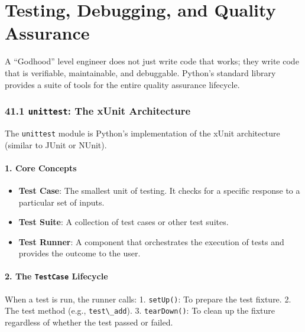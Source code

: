 \hypertarget{testing-debugging-and-quality-assurance}{%
\chapter{Testing, Debugging, and Quality
Assurance}\label{testing-debugging-and-quality-assurance}}

A ``Godhood'' level engineer does not just write code that works; they
write code that is verifiable, maintainable, and debuggable. Python's
standard library provides a suite of tools for the entire quality
assurance lifecycle.

\hypertarget{unittest-the-xunit-architecture}{%
\subsection{\texorpdfstring{41.1 \texttt{unittest}: The xUnit
Architecture}{41.1 unittest: The xUnit Architecture}}\label{unittest-the-xunit-architecture}}

The \passthrough{\lstinline!unittest!} module is Python's implementation
of the xUnit architecture (similar to JUnit or NUnit).

\hypertarget{core-concepts}{%
\subsubsection{1. Core Concepts}\label{core-concepts}}

\begin{itemize}
\tightlist
\item
  \textbf{Test Case}: The smallest unit of testing. It checks for a
  specific response to a particular set of inputs.
\item
  \textbf{Test Suite}: A collection of test cases or other test suites.
\item
  \textbf{Test Runner}: A component that orchestrates the execution of
  tests and provides the outcome to the user.
\end{itemize}

\hypertarget{the-testcase-lifecycle}{%
\subsubsection{\texorpdfstring{2. The \texttt{TestCase}
Lifecycle}{2. The TestCase Lifecycle}}\label{the-testcase-lifecycle}}

When a test is run, the runner calls: 1.
\passthrough{\lstinline!setUp()!}: To prepare the test fixture. 2. The
test method (e.g., \passthrough{\lstinline!test\_add!}). 3.
\passthrough{\lstinline!tearDown()!}: To clean up the fixture regardless
of whether the test passed or failed.

